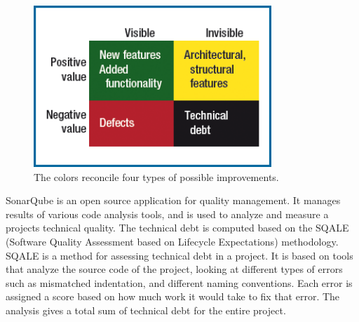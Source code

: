 \begin{figure}[ht!]
	\centering
	\includegraphics[width=0.8\textwidth]{images/fourColorBacklog.png}
	\caption{The colors reconcile four types of possible improvements.}
	\label{fig:fourColorBacklog}
\end{figure}

SonarQube is an open source application for quality management. It manages results of various code analysis tools, and is used to analyze and measure a projects technical quality. The technical debt is computed based on the SQALE (Software Quality Assessment based on Lifecycle Expectations) methodology. SQALE is a method for assessing technical debt in a project. It is based on tools that analyze the source code of the project, looking at different types of errors such as mismatched indentation, and different naming conventions. Each error is assigned a score based on how much work it would take to fix that error. The analysis gives a total sum of technical debt for the entire project.





